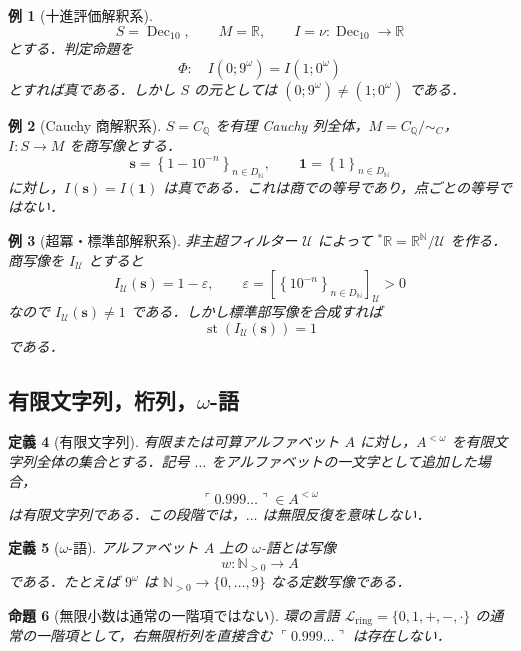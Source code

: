 \documentclass[a4paper,11pt]{ltjsarticle}
\theoremstyle{jpdef}
\newtheorem{definition}{定義}[section]
\newtheorem{example}[definition]{例}
\theoremstyle{jpthm}
\newtheorem{proposition}[definition]{命題}
\newcommand{\N}{\mathbb{N}}
\newcommand{\Q}{\mathbb{Q}}
\newcommand{\R}{\mathbb{R}}
\newcommand{\Lang}{\mathcal L}
\newcommand{\Dec}{\operatorname{Dec}_{10}}
\newcommand{\st}{\operatorname{st}}
\newcommand{\Ns}{\N_{>0}}
\newcommand{\DN}{D_{\N}}
\newcommand{\seq}[2]{\left\{#1\right\}_{#2}}
\begin{document}
\begin{example}[十進評価解釈系]
\[
  S=\Dec,
  \qquad
  M=\R,
  \qquad
  I=\nu:\Dec\to\R
\]
とする．判定命題を
\[
  \Phi:\quad I(0;9^\omega)=I(1;0^\omega)
\]
とすれば真である．しかし \(S\) の元としては \((0;9^\omega)\ne(1;0^\omega)\) である．
\end{example}

\begin{example}[Cauchy 商解釈系]
\(S=C_\Q\) を有理 Cauchy 列全体，\(M=C_\Q/\sim_C\)，\(I:S\to M\) を商写像とする．
\[
  \mathbf s=\seq{1-10^{-n}}{n\in\DN},
  \qquad
  \mathbf1=\seq{1}{n\in\DN}
\]
に対し，\(I(\mathbf s)=I(\mathbf1)\) は真である．これは商での等号であり，点ごとの等号ではない．
\end{example}

\begin{example}[超冪・標準部解釈系]
非主超フィルター \(\mathcal U\) によって \({}^{\ast}\R=\R^{\N}/\mathcal U\) を作る．商写像を \(I_{\mathcal U}\) とすると
\[
  I_{\mathcal U}(\mathbf s)=1-\varepsilon,
  \qquad
  \varepsilon=[\seq{10^{-n}}{n\in\DN}]_{\mathcal U}>0
\]
なので \(I_{\mathcal U}(\mathbf s)\ne1\) である．しかし標準部写像を合成すれば
\[
  \st(I_{\mathcal U}(\mathbf s))=1
\]
である．
\end{example}

\subsection{有限文字列，桁列，\(\omega\)-語}

\begin{definition}[有限文字列]
有限または可算アルファベット \(A\) に対し，\(A^{<\omega}\) を有限文字列全体の集合とする．記号 \(\ldots\) をアルファベットの一文字として追加した場合，
\[
  \ulcorner0.999\ldots\urcorner\in A^{<\omega}
\]
は有限文字列である．この段階では，\(\ldots\) は無限反復を意味しない．
\end{definition}

\begin{definition}[\(\omega\)-語]
アルファベット \(A\) 上の \(\omega\)-語とは写像
\[
  w:\Ns\to A
\]
である．たとえば \(9^\omega\) は \(\Ns\to\{0,\ldots,9\}\) なる定数写像である．
\end{definition}

\begin{proposition}[無限小数は通常の一階項ではない]
環の言語 \(\Lang_{\mathrm{ring}}=\{0,1,+,-,\cdot\}\) の通常の一階項として，右無限桁列を直接含む \(\ulcorner0.999\ldots\urcorner\) は存在しない．
\end{proposition}
\end{document}
